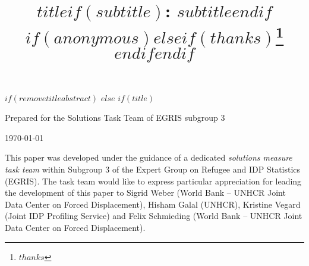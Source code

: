 \documentclass[$if(fontsize)$$fontsize$,$endif$$if(lang)$$babel-lang$,$endif$$if(papersize)$$papersize$,$endif$$for(classoption)$$classoption$$sep$,$endfor$]{article}
\title{$title$$if(subtitle)$: $subtitle$$endif$ $if(anonymous)$$else$$if(thanks)$\thanks{$thanks$} $endif$$endif$ }
\date{}
\let\oldmaketitle\maketitle
\begin{document}
	

$if(removetitleabstract)$
$else$
$if(title)$

{
\thispagestyle{empty}

\begin{center}

\vspace*{1.5cm}

\vspace*{1.5cm}

 Prepared for the Solutions Task Team of EGRIS subgroup 3

\bigskip
\today

\end{center}

\vfill


\noindent This paper was developed under the guidance of a dedicated \textit{solutions measure task team} within Subgroup 3 of the Expert Group on Refugee and IDP Statistics (EGRIS). The task team would like to express particular appreciation for leading the development of this paper to Sigrid Weber (World Bank – UNHCR Joint Data Center on Forced Displacement), Hisham Galal (UNHCR), Kristine Vegard (Joint IDP Profiling Service) and Felix Schmieding (World Bank – UNHCR Joint Data Center on Forced Displacement).


\let\maketitle\oldmaketitle
\maketitle

\setlength{\parindent}{0pt}
{\fontsize{18}{20}\selectfont\raggedright 
\maketitle  %

}



}
\end{document}
